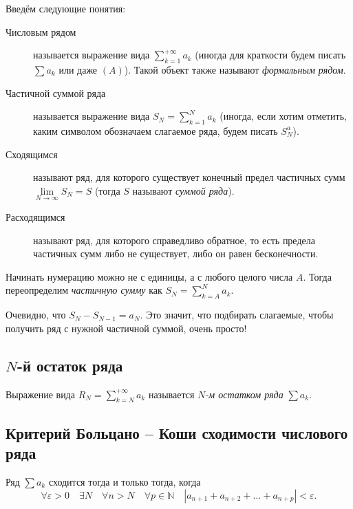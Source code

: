 \begin{definition}
	Введём следующие понятия:
	\begin{description}
		\item[Числовым рядом] называется выражение вида \(\sum\limits_{k=1}^{+\infty} a_k\) (иногда для краткости будем писать \(\sum a_k\) или даже \((A)\)). Такой объект также называют \textit{формальным рядом}.
		\item[Частичной суммой ряда] называется выражение вида \(S_N = \sum\limits_{k=1}^{N} a_k\) (иногда, если хотим отметить, каким символом обозначаем слагаемое ряда, будем писать \(S_N^a\)).
		\item[Сходящимся] называют ряд, для которого существует конечный предел частичных сумм \(\lim\limits_{N \to \infty} S_N = S\) (тогда \(S\) называют \textit{суммой ряда}).
		\item[Расходящимся] называют ряд, для которого справедливо обратное, то есть предела частичных сумм либо не существует, либо он равен бесконечности.
	\end{description}
\end{definition}

\begin{nremark}
	Начинать нумерацию можно не с единицы, а с любого целого числа \(A\). Тогда переопределим \textit{частичную сумму} как \(S_N = \sum\limits_{k=A}^{N} a_k\).
\end{nremark}

\begin{nremark}
	Очевидно, что \(S_N - S_{N-1} = a_N\). Это значит, что подбирать слагаемые, чтобы получить ряд с нужной частичной суммой, очень просто!
\end{nremark}

\subsection{\(N\)-й остаток ряда}

\begin{definition}
	Выражение вида \(R_N = \sum\limits_{k=N}^{+\infty} a_k\) называется \textit{\(N\)-м остатком ряда} \(\sum a_k\).
\end{definition}

\subsection{Критерий Больцано -- Коши сходимости числового ряда}

\begin{theorem}
	Ряд \(\sum a_k\) сходится тогда и только тогда, когда \[
	\forall \varepsilon > 0 \quad \exists N \quad \forall n > N \quad \forall p \in \mathbb{N} \quad |a_{n+1} + a_{n+2} + \ldots + a_{n+p}| < \varepsilon.
	\]
\end{theorem}